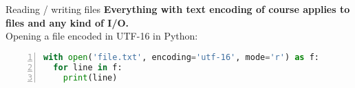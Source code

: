 \documentclass[../index.tex]{subfiles}
\begin{document}
\renewcommand{\currenttitle}{Reading / writing files}
\begin{frame}[fragile]{\currenttitle}
%
%
% 
  \textbf{Everything with text encoding of course applies to files and any kind of I/O.}
  \\[2em]

  Opening a file encoded in UTF-16 in Python: \\[1em]

  \begin{lstlisting}[language=Python,numbers=left]
with open('file.txt', encoding='utf-16', mode='r') as f:
  for line in f:
    print(line)
  \end{lstlisting}
\end{frame}

\end{document}
